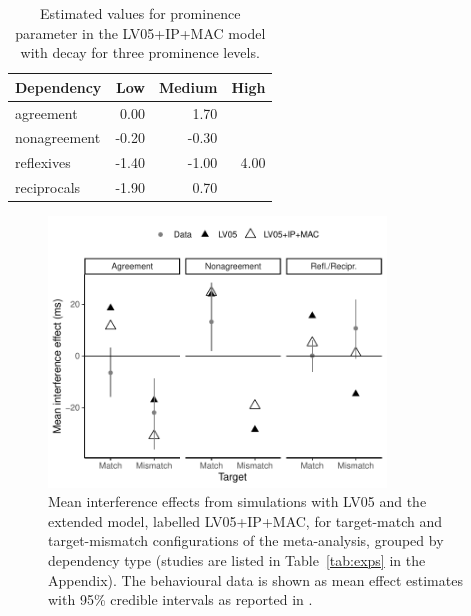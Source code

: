 \documentclass{cambridge7A}\usepackage[]{graphicx}\usepackage[]{color}
\begin{document}
\begin{table}[ht]
\centering
\caption{Estimated values for prominence parameter in the LV05+IP+MAC model with decay for three prominence levels.} 
\label{tab:promtab}
\begin{tabular}{lrrr}
Dependency & Low & Medium & High \\ 
\hline
agreement & 0.00 & 1.70 &  \\ 
  nonagreement & -0.20 & -0.30 &  \\ 
  reflexives & -1.40 & -1.00 & 4.00 \\ 
  reciprocals & -1.90 & 0.70 &  \\ 
\end{tabular}
\end{table}








\begin{figure}[!htbp]
\centering
\includegraphics[width=0.8\textwidth]{figures/fig-simresultsBayesMeans} 
\caption{Mean interference effects from simulations with LV05 and the extended model, labelled LV05+IP+MAC, for target-match and target-mismatch configurations of the meta-analysis, grouped by dependency type (studies are listed in Table~\ref{tab:exps} in the Appendix). The behavioural data is shown as mean effect estimates with 95\% credible intervals as reported in \cite{JaegerEngelmannVasishth2017}.}\label{fig:simresultsBayesMeans} 
\end{figure}
%
\end{document}
